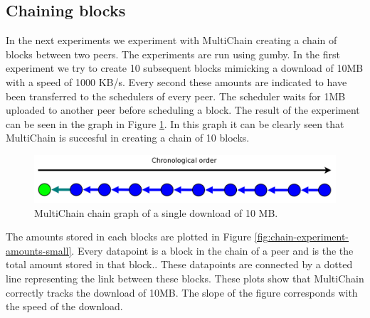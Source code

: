 \subsection{Chaining blocks}
In the next experiments we experiment with MultiChain creating a chain of blocks between two peers.
The experiments are run using gumby.
In the first experiment we try to create 10 subsequent blocks mimicking a download of 10MB with a speed of 1000 KB/s.
Every second these amounts are indicated to have been transferred to the schedulers of every peer.
The scheduler waits for 1MB uploaded to another peer before scheduling a block.
The result of the experiment can be seen in the graph in Figure \ref{fig:chain-experiment-graph}.
In this graph it can be clearly seen that MultiChain is succesful in creating a chain of 10 blocks.

\begin{figure}[!h]
	\centerline{\includegraphics[scale=0.20]{experimentation/chain/chain.png}}
	\caption{MultiChain chain graph of a single download of 10 MB.}
	\label{fig:chain-experiment-graph}
\end{figure}

The amounts stored in each blocks are plotted in Figure \ref{fig:chain-experiment-amounts-small}.
Every datapoint is a block in the chain of a peer and is the the total amount stored in that block..
These datapoints are connected by a dotted line representing the link between these blocks.
These plots show that MultiChain correctly tracks the download of 10MB.
The slope of the figure corresponds with the speed of the download.

